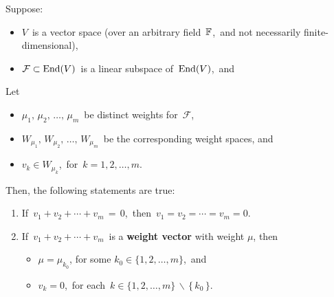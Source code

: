 \vskip 0.5cm
\begin{proposition}
\label{DistinctWeightSpacesAreLinearIndependent}
\mbox{}
\vskip 0.05cm
\noindent
Suppose:
\begin{itemize}
\item
    $V$\, is a vector space
    (over an arbitrary field \,$\mathbb{F}$,\, and not necessarily finite-dimensional),
\item
    $\mathcal{F} \subset \textnormal{End}(V)$\, is a linear subspace of \,$\textnormal{End}(V)$,\, and
\end{itemize}
Let
\begin{itemize}
\item
    $\mu_{1},\, \mu_{2},\, \ldots,\, \mu_{m}$\, be distinct weights for \,$\mathcal{F}$,\,
\item
    $W_{\mu_{1}},\, W_{\mu_{2}},\, \ldots,\, W_{\mu_{m}}$\, be the corresponding weight spaces, and
\item
    $v_{k} \in W_{\mu_{k}}$,\, for \,$k = 1, 2, \ldots, m$.
\end{itemize}
Then, the following statements are true:
\begin{enumerate}
\item
    If \,$v_{1} + v_{2} + \cdots + v_{m} \,=\, 0$,\,
    then \,$v_{1} = v_{2} = \cdots = v_{m} = 0$.
\item
    If \,$v_{1} + v_{2} + \cdots + v_{m}$\, is a \textbf{\color{black}weight vector} with weight $\mu$,
    then
    \begin{itemize}
    \item
        $\mu = \mu_{k_{0}}$, for some $k_{0} \in \{1,2,\ldots,m\}$,\, and
    \item
        $v_{k} = 0$,\, for each \,$k \in \{1,2,\ldots,m\} \,\backslash\, \{\,k_{0}\,\}$.
    \end{itemize}
\end{enumerate}
\end{proposition}
\proof
